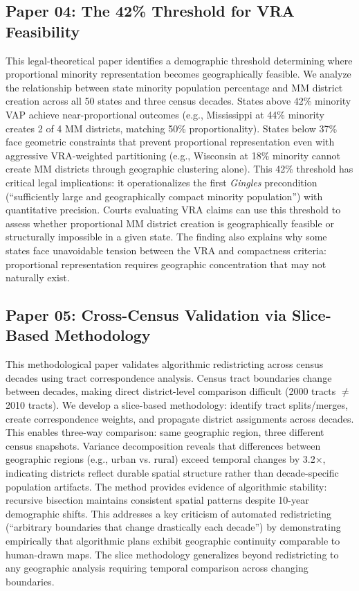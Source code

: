 \documentclass[11pt]{article}
\begin{document}
\subsection*{Paper 04: The 42\% Threshold for VRA Feasibility}

This legal-theoretical paper identifies a demographic threshold determining where proportional minority representation becomes geographically feasible. We analyze the relationship between state minority population percentage and MM district creation across all 50 states and three census decades. States above 42\% minority VAP achieve near-proportional outcomes (e.g., Mississippi at 44\% minority creates 2 of 4 MM districts, matching 50\% proportionality). States below 37\% face geometric constraints that prevent proportional representation even with aggressive VRA-weighted partitioning (e.g., Wisconsin at 18\% minority cannot create MM districts through geographic clustering alone). This 42\% threshold has critical legal implications: it operationalizes the first \emph{Gingles} precondition (``sufficiently large and geographically compact minority population'') with quantitative precision. Courts evaluating VRA claims can use this threshold to assess whether proportional MM district creation is geographically feasible or structurally impossible in a given state. The finding also explains why some states face unavoidable tension between the VRA and compactness criteria: proportional representation requires geographic concentration that may not naturally exist.

\subsection*{Paper 05: Cross-Census Validation via Slice-Based Methodology}

This methodological paper validates algorithmic redistricting across census decades using tract correspondence analysis. Census tract boundaries change between decades, making direct district-level comparison difficult (2000 tracts $\neq$ 2010 tracts). We develop a slice-based methodology: identify tract splits/merges, create correspondence weights, and propagate district assignments across decades. This enables three-way comparison: same geographic region, three different census snapshots. Variance decomposition reveals that differences between geographic regions (e.g., urban vs. rural) exceed temporal changes by 3.2×, indicating districts reflect durable spatial structure rather than decade-specific population artifacts. The method provides evidence of algorithmic stability: recursive bisection maintains consistent spatial patterns despite 10-year demographic shifts. This addresses a key criticism of automated redistricting (``arbitrary boundaries that change drastically each decade'') by demonstrating empirically that algorithmic plans exhibit geographic continuity comparable to human-drawn maps. The slice methodology generalizes beyond redistricting to any geographic analysis requiring temporal comparison across changing boundaries.
\end{document}
